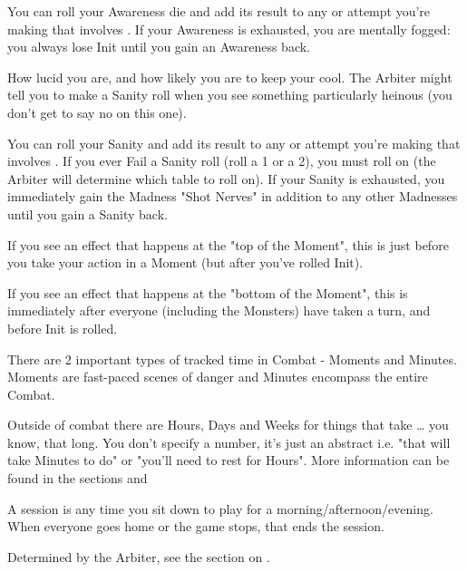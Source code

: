 {You can roll your Awareness die and add its result to any \RO or \RB attempt you're making that involves \INT.  If your Awareness is exhausted, you are mentally fogged: you always lose Init until you gain an Awareness \UD back.



How lucid you are, and how likely you are to keep your cool.  The Arbiter might tell you to make a Sanity roll when you see something particularly heinous (you don't get to say no on this one).  

You can roll your Sanity \UD and add its result to any \RO or \RB attempt you're making that involves \FOC.  If you ever Fail a Sanity roll (roll a 1 or a 2), you must roll on  (the Arbiter will determine which table to roll on). If your Sanity is exhausted, you immediately gain the Madness "Shot Nerves" in addition to any other Madnesses until you gain a Sanity \UD back.

\newpage



If you see an effect that happens at the "top of the Moment", this is just before you take your  action in a Moment (but after you've rolled Init).

If you see an effect that happens at the "bottom of the Moment", this is immediately after everyone (including the Monsters) have taken a turn, and before Init is rolled.


There are 2 important types of tracked time in Combat - Moments and Minutes.  Moments are fast-paced scenes of danger and Minutes encompass the entire Combat.  



Outside of combat there are Hours, Days and Weeks for things that take … you know, that long.  You don't specify a number, it's just an abstract i.e. "that will take Minutes to do" or "you'll need to rest for Hours".  More information can be found in the sections  and 

A session is any time you sit down to play for a morning/afternoon/evening.  When everyone goes home or the game stops, that ends the session.


Determined by the Arbiter, see the section on .

}
